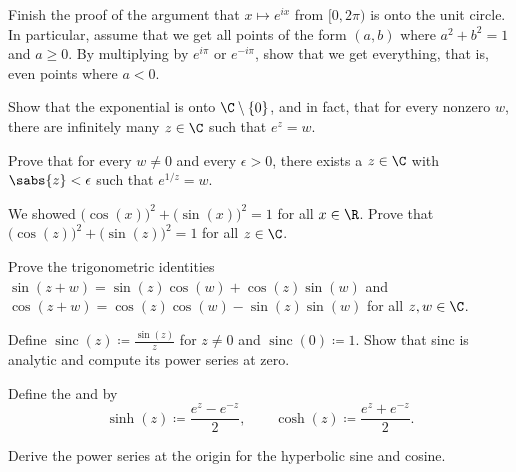 \begin{exercise}
Finish the proof of the argument that $x \mapsto e^{ix}$ from
$[0,2\pi)$ is onto the unit circle.  In particular, assume that
we get all points of the form $(a,b)$ where $a^2+b^2=1$ and $a \geq 0$.
By multiplying by $e^{i\pi}$ or $e^{-i\pi}$, show that we get everything,
that is, even points where $a < 0$.
\end{exercise}

\begin{exercise}
Show that the exponential is onto $\C \setminus \{ 0 \}$, and in fact,
that for every nonzero $w$, there are infinitely many $z \in \C$ such that $e^z=w$.
\end{exercise}

\begin{exercise}
Prove that for every $w \not= 0$ and every $\epsilon > 0$,
there exists a $z \in \C$ with $\sabs{z} < \epsilon$ such that $e^{1/z} = w$.
\end{exercise}

\begin{exercise}\label{exercise:cossinidentity}
We showed
${\bigl( \cos(x) \bigr)}^2 + {\bigl( \sin(x) \bigr)}^2 = 1$
for all $x \in \R$.
Prove that
${\bigl( \cos(z) \bigr)}^2 + {\bigl( \sin(z) \bigr)}^2 = 1$
for all $z \in \C$.
\end{exercise}

\begin{exercise}
Prove the trigonometric identities
$\sin(z + w) = \sin(z) \cos(w) + \cos(z) \sin(w)$ and
$\cos(z + w) = \cos(z) \cos(w) - \sin(z) \sin(w)$ for all $z,w \in \C$.
\end{exercise}

\begin{exercise}
Define $\operatorname{sinc}(z) \coloneqq \frac{\sin(z)}{z}$ for $z \not=0$ and
$\operatorname{sinc}(0) \coloneqq 1$.
Show that sinc is analytic and compute its power series at zero.
\end{exercise}

\begin{exnote}
\pagebreak[2]
Define the \emph{} and
\emph{} by
\begin{equation*}
\sinh(z) \coloneqq \frac{e^z-e^{-z}}{2}, \qquad
\cosh(z) \coloneqq \frac{e^z+e^{-z}}{2}.
\end{equation*}
\end{exnote}

\begin{exercise}
Derive the power series at the origin for the hyperbolic sine and cosine.
\end{exercise}

